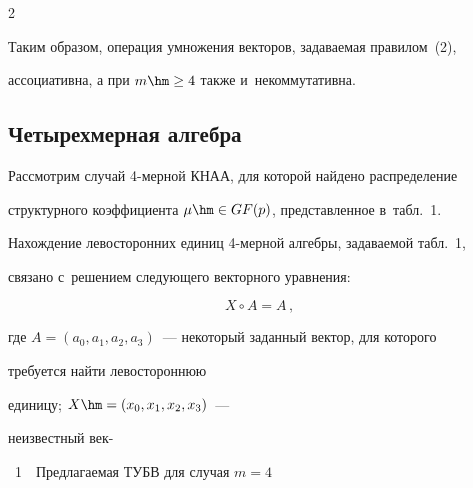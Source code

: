 \begin{multicols}{2}
  


  Таким образом, операция умножения векторов, задаваемая правилом~(2), 


ассоциативна, а при $m\hm\geq4$ также и~некоммутативна. 


  


  \subsection{Четырехмерная алгебра}


  


  Рассмотрим случай 4-мер\-ной КНАА, для которой найдено распределение 


структурного коэффициента $\mu\hm\in GF(p)$, представленное в~табл.~1.


  


  


  


  Нахождение левосторонних единиц 4-мер\-ной алгебры, задаваемой табл.~1, 


связано с~решением следующего векторного уравнения:


  \begin{equation}


  X\circ A=A\,,


  \label{e5-f}


  \end{equation}


где $A=(a_0, a_1, a_2, a_3)$~--- некоторый заданный вектор, для которого 


требуется найти левостороннюю


единицу; $X\hm= (x_0, x_1, x_2, x_3)$~--- 


неизвестный век-\linebreak\vspace*{-12pt}





\vspace*{9pt} %





\begin{center}


\noindent


\parbox{50mm}{{{\tablename~1}\ \ \small{Предлагаемая ТУБВ для случая $m = 4$}}}



\end{center}
\end{multicols}
